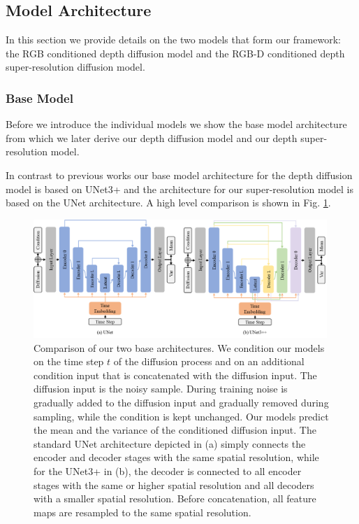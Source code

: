 \subsection{Model Architecture} \label{subsec:model_architecture}
In this section we provide details on the two models that form our \modelname{} framework: the RGB conditioned depth diffusion model and the RGB-D conditioned depth super-resolution diffusion model.

\subsubsection{Base Model} \label{subsubsec:base_model}
Before we introduce the individual models we show the base model architecture from which we later derive our depth diffusion model and our depth super-resolution model.

In contrast to previous works \citep{dhariwal_diffusion_2021,nichol_improved_2021, ho_cascaded_2021} our base model architecture for the depth diffusion model is based on UNet3+ \citep{huang_unet_2020} and the architecture for our super-resolution model is based on the UNet architecture. A high level comparison is shown in Fig. \ref{fig:base_architecture}.

\begin{figure}[t]
  \centering
  \includegraphics[width=0.99\textwidth]{illustrations/unet_combined.png}
  \caption{Comparison of our two base architectures. We condition our models on the time step $t$ of the diffusion process and on an additional condition input that is concatenated with the diffusion input. The diffusion input is the noisy sample. During training noise is gradually added to the diffusion input and gradually removed during sampling, while the condition is kept unchanged. Our models predict the mean and the variance of the conditioned diffusion input. The standard UNet architecture depicted in (a) simply connects the encoder and decoder stages with the same spatial resolution, while for the UNet3+ in (b), the decoder is connected to all encoder stages with the same or higher spatial resolution and all decoders with a smaller spatial resolution. Before concatenation, all feature maps are resampled to the same spatial resolution.}
  \label{fig:base_architecture}
\end{figure}

